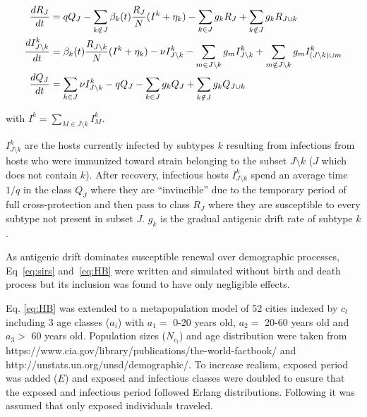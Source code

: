 \documentclass[12pt]{article}
\begin{document}
\begin{footnotesize}
  \begin{align}
    \label{eq:HB}
    \frac{dR_J}{dt} &= q Q_J - \sum_{k \notin J} \beta_k(t)
    \frac{R_{J}}{N} (I^k+\eta_k) -\sum_{k \in J} g_k R_{J} + \sum_{k
      \notin J} g_k
    R_{J \cup k } \\
    \frac{dI^k_{J \setminus k}}{dt} &= \beta_k(t) \frac{R_{J \setminus
        k}}{N} (I^k+\eta_k) - \nu I^k_{J \setminus k} -\sum_{m \in J
      \setminus k} g_m I^k_{J \setminus k} + \sum_{m \notin J
      \setminus k} g_m I^k_{(J \setminus k) \cup m}
    \notag \\
    \frac{dQ_J}{dt} &= \sum_{k \in J} \nu I^k_{J \setminus k} - q Q_J
    -\sum_{k \in J} g_k Q_{J} + \sum_{k \notin J} g_k Q_{J \cup k }
    \notag
  \end{align}
\end{footnotesize}

with $I^k=\sum_{M \in J \setminus k} I^k_M$.

$I^k_{J\setminus k}$ are the hosts currently infected by subtypes $k$
resulting from infections from hosts who were immunized toward strain
belonging to the subset $J \setminus k$ ($J$ which does not contain
$k$). After recovery, infectious hosts $I^k_{J\setminus k}$ spend an
average time $1/q$ in the class $Q_J$ where they are ``invincible''
due to the temporary period of full cross-protection and then pass to
class $R_J$ where they are susceptible to every subtype not present in
subset $J$. $g_k$ is the gradual antigenic drift rate of subtype $k$.

As antigenic drift dominates susceptible renewal over demographic
processes, Eq~\eqref{eq:sirs} and~\eqref{eq:HB} were written and
simulated without birth and death process but its inclusion was found
to have only negligible effects.

Eq. \eqref{eq:HB} was extended to a metapopulation model of 52 cities
indexed by $c_l$ including 3 age classes ($a_i$) with $a_1 =$ 0-20
years old, $a_2 =$ 20-60 years old and $a_3 >$ 60 years
old. Population sizes ($N_{c_l}$) and age distribution were taken from
https://www.cia.gov/library/publications/the-world-factbook/ and
http://unstats.un.org/unsd/demographic/. To increase realism, exposed
period was added ($E$) and exposed and infectious classes were doubled
to ensure that the exposed and infectious period followed Erlang
distributions.  Following \citet{Cooper2006a} it was assumed that only
exposed individuals traveled.
\end{document}
